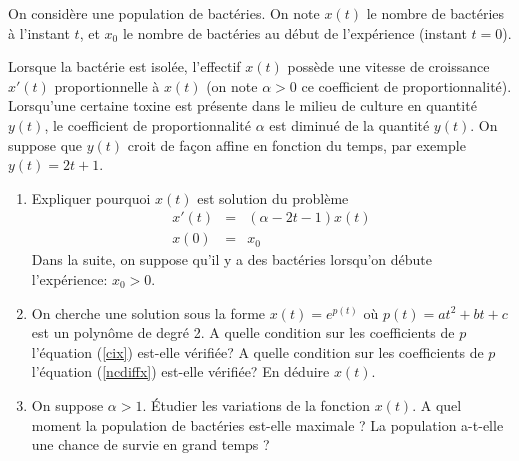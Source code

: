 \begin{exo}
    On considère une population de bactéries. On note $x(t)$ le nombre de bactéries à l'instant $t$, et $x_0$ le nombre de bactéries au début de l'expérience (instant $t=0$).

    Lorsque la bactérie est isolée, l'effectif $x(t)$ possède une vitesse de
    croissance $x'(t)$ proportionnelle à $x(t)$ (on note $\alpha>0$ ce coefficient de proportionnalité). Lorsqu'une certaine toxine est présente dans le milieu de culture en quantité $y(t)$, le coefficient de proportionnalité $\alpha$ est diminué de la quantité $y(t)$.
    On suppose que $y(t)$ croit de façon affine en fonction du temps, par exemple $y(t) = 2t + 1$.
    \begin{enumerate}
        \item Expliquer pourquoi $x(t)$ est solution du problème
        \begin{eqnarray}
            x'(t) & = & (\alpha - 2t -1)x(t) \label{ncdiffx} \\
            x(0)  & = & x_0 \label{cix}
        \end{eqnarray}
        Dans la suite, on suppose qu'il y a des bactéries lorsqu'on débute l'expérience: $x_0>0$.
        \item On cherche une solution sous la forme $x(t) = e^{p(t)}$ où $p(t)=at^2+bt+c$ est un polynôme de degré 2. A quelle condition sur les coefficients de $p$ l'équation (\ref{cix}) est-elle vérifiée? A quelle condition sur les coefficients de $p$ l'équation (\ref{ncdiffx}) est-elle vérifiée? En déduire $x(t)$.
        \item On suppose $\alpha > 1$. Étudier les variations de la fonction $x(t)$. A quel moment la population de bactéries est-elle maximale ?
        La population a-t-elle une chance de survie en grand temps ?
    \end{enumerate}
\end{exo}

